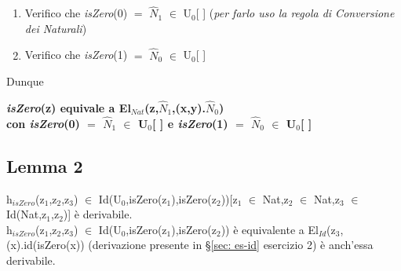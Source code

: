 \begin{enumerate}
\item Verifico che \textit{isZero}(0) $=$ $\hat{N}_1$ $\in$ U$_0$[ ] (\textit{per farlo uso la regola di Conversione dei Naturali})

\begin{prooftree}



\end{prooftree}
\noindent

\item Verifico che \textit{isZero}(1) $=$ $\hat{N}_0$ $\in$ U$_0$[ ]

\begin{prooftree}




\end{prooftree}
\noindent
\end{enumerate}
\noindent
Dunque \begin{center}\textbf{\textit{isZero}(z) equivale a El$_{Nat}$(z,$\hat{N}_1$,(x,y).$\hat{N}_0$)\\
con \textit{isZero}(0) $=$ $\hat{N}_1$ $\in$ U$_0$[ ] e \textit{isZero}(1) $=$ $\hat{N}_0$ $\in$ U$_0$[ ]}\end{center}

\subsection{Lemma 2}
h$_{isZero}$(z$_1$,z$_2$,z$_3$) $\in$ Id(U$_0$,isZero(z$_1$),isZero(z$_2$))[z$_1$ $\in$ Nat,z$_2$ $\in$ Nat,z$_3$ $\in$ Id(Nat,z$_1$,z$_2$)] \`e derivabile.\\
h$_{isZero}$(z$_1$,z$_2$,z$_3$) $\in$ Id(U$_0$,isZero(z$_1$),isZero(z$_2$)) \`e equivalente a El$_{Id}$(z$_3$,(x).id(isZero(x)) (derivazione presente in \S\ref{sec: es-id} esercizio 2) \`e anch'essa derivabile.

